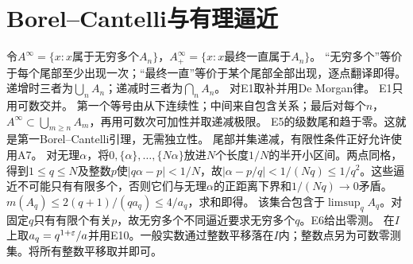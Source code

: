 \documentclass[UTF8,fontset=fandol,11pt]{ctexart}
\begin{document}
\section{Borel--Cantelli与有理逼近}
令$A^\infty=\{x:x\text{属于无穷多个}A_n\}$，$A^\infty_+=\{x:x\text{最终一直属于}A_n\}$。
“无穷多个”等价于每个尾部至少出现一次；“最终一直”等价于某个尾部全部出现，逐点翻译即得。
递增时三者为$\bigcup_nA_n$；递减时三者为$\bigcap_nA_n$。
对E1取补并用De Morgan律。
E1只用可数交并。
第一个等号由从下连续性；中间来自包含关系；最后对每个$n$，$A^\infty\subset\bigcup_{m\ge n}A_m$，再用可数次可加性并取递减极限。
E5的级数尾和趋于零。这就是第一Borel--Cantelli引理，无需独立性。
尾部并集递减，有限性条件正好允许使用A7。
对无理$\alpha$，将$0,\{\alpha\},\ldots,\{N\alpha\}$放进$N$个长度$1/N$的半开小区间。两点同格，得到$1\le q\le N$及整数$p$使$|q\alpha-p|<1/N$，故$|\alpha-p/q|<1/(Nq)\le1/q^2$。这些逼近不可能只有有限多个，否则它们与无理$\alpha$的正距离下界和$1/(Nq)\to0$矛盾。
$m(A_q)\le2(q+1)/(qa_q)\le4/a_q$，求和即得。
该集合包含于$\limsup_qA_q$。对固定$q$只有有限个有关$p$，故无穷多个不同逼近要求无穷多个$q$。E6给出零测。
在$I$上取$a_q=q^{1+\varepsilon}/a$并用E10。一般实数通过整数平移落在$I$内；整数点另为可数零测集。将所有整数平移取并即可。
\originalpages
\end{document}
